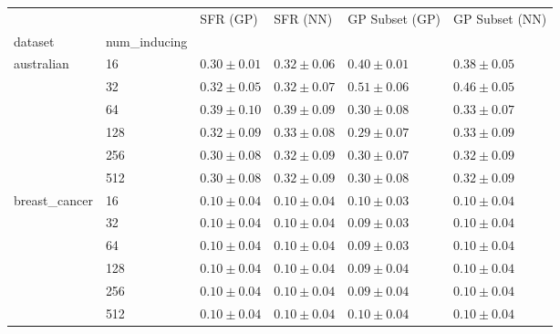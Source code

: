 \begin{tabular}{llllll}
\toprule
 &  & SFR (GP) & SFR (NN) & GP Subset (GP) & GP Subset (NN) \\
dataset & num_inducing &  &  &  &  \\
\midrule
\multirow[t]{6}{*}{australian} & 16 & $0.30 \pm 0.01$ & $0.32 \pm 0.06$ & $0.40 \pm 0.01$ & $0.38 \pm 0.05$ \\
 & 32 & $0.32 \pm 0.05$ & $0.32 \pm 0.07$ & $0.51 \pm 0.06$ & $0.46 \pm 0.05$ \\
 & 64 & $0.39 \pm 0.10$ & $0.39 \pm 0.09$ & $0.30 \pm 0.08$ & $0.33 \pm 0.07$ \\
 & 128 & $0.32 \pm 0.09$ & $0.33 \pm 0.08$ & $0.29 \pm 0.07$ & $0.33 \pm 0.09$ \\
 & 256 & $0.30 \pm 0.08$ & $0.32 \pm 0.09$ & $0.30 \pm 0.07$ & $0.32 \pm 0.09$ \\
 & 512 & $0.30 \pm 0.08$ & $0.32 \pm 0.09$ & $0.30 \pm 0.08$ & $0.32 \pm 0.09$ \\
\cline{1-6}
\multirow[t]{6}{*}{breast_cancer} & 16 & $0.10 \pm 0.04$ & $0.10 \pm 0.04$ & $0.10 \pm 0.03$ & $0.10 \pm 0.04$ \\
 & 32 & $0.10 \pm 0.04$ & $0.10 \pm 0.04$ & $0.09 \pm 0.03$ & $0.10 \pm 0.04$ \\
 & 64 & $0.10 \pm 0.04$ & $0.10 \pm 0.04$ & $0.09 \pm 0.03$ & $0.10 \pm 0.04$ \\
 & 128 & $0.10 \pm 0.04$ & $0.10 \pm 0.04$ & $0.09 \pm 0.04$ & $0.10 \pm 0.04$ \\
 & 256 & $0.10 \pm 0.04$ & $0.10 \pm 0.04$ & $0.09 \pm 0.04$ & $0.10 \pm 0.04$ \\
 & 512 & $0.10 \pm 0.04$ & $0.10 \pm 0.04$ & $0.10 \pm 0.04$ & $0.10 \pm 0.04$ \\
\cline{1-6}
\bottomrule
\end{tabular}
